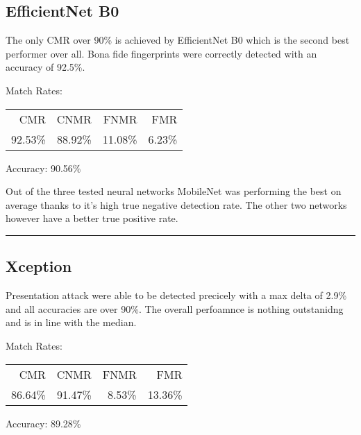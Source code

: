 \bigskip
\subsection{EfficientNet B0}
\begin{minipage}[c]{0.7\textwidth}

    The only CMR over 90\% is achieved by EfficientNet B0 which is the second best performer over all.
    Bona fide fingerprints were correctly detected with an accuracy of 92.5\%.
    
    \medskip\noindent\centering Match Rates: 
    \begin{tabular}{ r  r  r  r |}
        CMR     & CNMR          & FNMR                 & FMR     \\
        92.53\% & 88.92\%       & 11.08\%              & 6.23\%  \\
    \end{tabular} \hspace{2mm} Accuracy: 90.56\%
\end{minipage}
\hfill
\begin{minipage}[c]{0.3\textwidth}
    \centering
    
\end{minipage}

\medskip\noindent


\bigskip\bigskip\noindent
Out of the three tested neural networks MobileNet was performing the best on average thanks to it's high true negative detection rate.
The other two networks however have a better true positive rate.
\bigskip\hrule\bigskip


\subsection{Xception}
\begin{minipage}[c]{0.7\textwidth}
    Presentation attack were able to be detected precicely with a max delta of 2.9\% and all accuracies are over 90\%.
    The overall perfoamnce is nothing outstanidng and is in line with the median.

    \medskip\noindent\centering Match Rates: 
    \begin{tabular}{ r  r  r  r |}
        CMR       & CNMR      & FNMR     & FMR     \\
        86.64\%   & 91.47\%   & 8.53\%   & 13.36\%  \\
    \end{tabular} \hspace{2mm} Accuracy: 89.28\%
\end{minipage}
\hfill
\begin{minipage}[c]{0.3\textwidth}
    \centering
    
\end{minipage}


